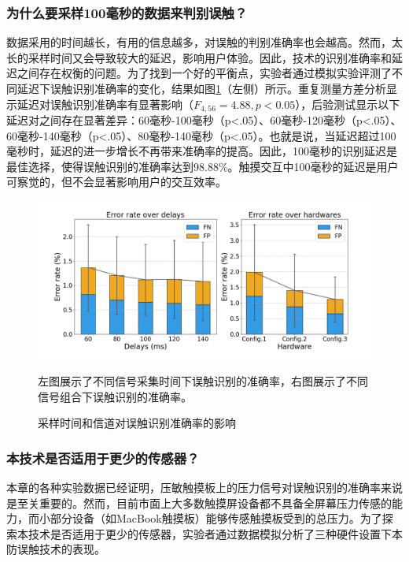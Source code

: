 \subsubsection{为什么要采样100毫秒的数据来判别误触？} 

数据采用的时间越长，有用的信息越多，对误触的判别准确率也会越高。然而，太长的采样时间又会导致较大的延迟，影响用户体验。因此，技术的识别准确率和延迟之间存在权衡的问题。为了找到一个好的平衡点，实验者通过模拟实验评测了不同延迟下误触识别准确率的变化，结果如图\ref{fig:TypeBoard_error_rate_diss}（左侧）所示。重复测量方差分析显示延迟对误触识别准确率有显著影响（$F_{4,56}=4.88, p<0.05$），后验测试显示以下延迟对之间存在显著差异：60毫秒-100毫秒（p<.05）、60毫秒-120毫秒（p<.05）、60毫秒-140毫秒（p<.05）、80毫秒-140毫秒（p<.05）。也就是说，当延迟超过100毫秒时，延迟的进一步增长不再带来准确率的提高。因此，100毫秒的识别延迟是最佳选择，使得误触识别的准确率达到98.88\%。触摸交互中100毫秒的延迟是用户可察觉的，但不会显著影响用户的交互效率\cite{2017-System, 2014-Towards, 2016-Latency}。

\begin{figure}[!tbh]
	\includegraphics[width=1.0\linewidth]{figures/TypeBoard_error_rate_diss.png}
	\centering
	\caption*{左图展示了不同信号采集时间下误触识别的准确率，右图展示了不同信号组合下误触识别的准确率。}
	\caption{采样时间和信道对误触识别准确率的影响}
	\label{fig:TypeBoard_error_rate_diss}
\end{figure}

\subsubsection{本技术是否适用于更少的传感器？}

本章的各种实验数据已经证明，压敏触摸板上的压力信号对误触识别的准确率来说是至关重要的。然而，目前市面上大多数触摸屏设备都不具备全屏幕压力传感的能力，而小部分设备（如MacBook触摸板）能够传感触摸板受到的总压力。为了探索本技术是否适用于更少的传感器，实验者通过数据模拟分析了三种硬件设置下本防误触技术的表现。

